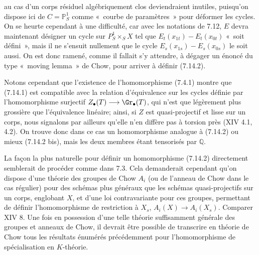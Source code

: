 
au cas d'un corps résiduel algébriquement clos deviendraient inutiles, puisqu'on dispose ici de \(C=\mathbb P^1_S\) comme «~courbe de paramètres~» pour déformer les cycles. On se heurte cependant à une difficulté, car avec les notations de 7.12, \(E\) devra maintenant désigner un cycle sur \(P^1_S\times_SX\) tel que \(E_t(x_{1t})-E_t(x_{0t})\) «~soit défini~», mais il ne s'ensuit nullement que le cycle \(E_s(x_{1s})-E_s(x_{0s})\) le soit aussi. On est donc ramené, comme il fallait s'y attendre, à dégager un énoncé du type «~moving lemma~» de Chow, pour arriver à définir (7.14.2).

Notons cependant que l'existence de l'homomorphisme (7.4.1) montre que (7.14.1) est compatible avec la relation d'équivalence sur les cycles définie par l'homomorphisme surjectif \(Z_\bullet(T)\longrightarrow \Gr_\bullet(T)\), qui n'est que légèrement plus grossière que l'équivalence linéaire; ainsi, si \(Z\) est quasi-projectif et lisse sur un corps, nous signalons par ailleurs qu'elle n'en diffère pas à torsion près (XIV 4.1, 4.2). On trouve donc dans ce cas un homomorphisme analogue à (7.14.2) ou mieux (7.14.2 bis), mais les deux membres étant tensorisés par \(\mathbb Q\).

La façon la plus naturelle pour définir un homomorphisme (7.14.2) directement semblerait de procéder comme dans 7.3. Cela demanderait cependant qu'on dispose d'une théorie des groupes de Chow \(A_i\) (ou de l'anneau de Chow dans le cas régulier) pour des schémas plus généraux que les schémas quasi-projectifs sur un corps, englobant \(X\), et d'une loi contravariante pour ces groupes, permettant de définir l'homomorphisme de restriction à \(X_s\), \(A_i(X)\longrightarrow A_i(X_s)\). Comparer XIV 8. Une fois en possession d'une telle théorie suffisamment générale des groupes et anneaux de Chow, il devrait être possible de transcrire en théorie de Chow tous les résultats énumérés précédemment pour l'homomorphisme de spécialisation en \(K\)-théorie.

